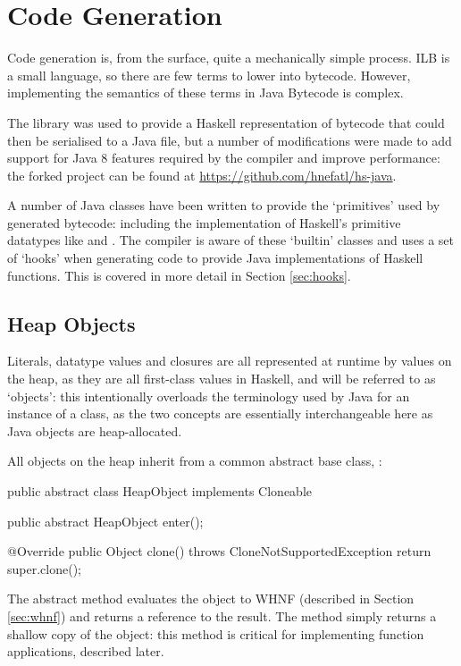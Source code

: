 \documentclass[dissertation.tex]{subfiles}
\begin{document}
\section{Code Generation}
{
    Code generation is, from the surface, quite a mechanically simple process. ILB is a small language, so there are few terms to lower into bytecode. However, implementing the semantics of these terms in Java Bytecode is complex.

    The  library was used to provide a Haskell representation of bytecode that could then be serialised to a Java  file, but a number of modifications were made to add support for Java 8 features required by the compiler and improve performance: the forked project can be found at \url{https://github.com/hnefatl/hs-java}.

    A number of Java classes have been written to provide the `primitives' used by generated bytecode: including the implementation of Haskell's primitive datatypes like  and . The compiler is aware of these `builtin' classes and uses a set of `hooks' when generating code to provide Java implementations of Haskell functions. This is covered in more detail in Section \ref{sec:hooks}.

    \subsection{Heap Objects}\label{sec:heap-objects}
    {
        Literals, datatype values and closures are all represented at runtime by values on the heap, as they are all first-class values in Haskell, and will be referred to as `objects': this intentionally overloads the terminology used by Java for an instance of a class, as the two concepts are essentially interchangeable here as Java objects are heap-allocated.

        All objects on the heap inherit from a common abstract base class, :

        \begin{javafigure}
        public abstract class HeapObject implements Cloneable {
            public abstract HeapObject enter();

            @Override
            public Object clone() throws CloneNotSupportedException {
                return super.clone();
            }
        }
        \end{javafigure}

        The abstract  method evaluates the object to WHNF (described in Section \ref{sec:whnf}) and returns a reference to the result. The  method simply returns a shallow copy of the object: this method is critical for implementing function applications, described later.

}}
\end{document}
